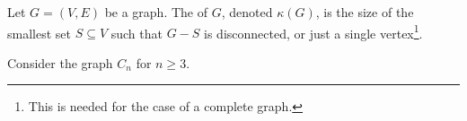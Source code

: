 \documentclass[a4paper]{scrartcl}
\begin{document}
\begin{definition}[Connectivity]
	Let $G = (V, E)$ be a graph. The  of $G$, denoted $\kappa(G)$, is the size of the smallest set $S \subseteq V$ such that $G - S$ is disconnected, or just a single vertex\footnote{This is needed for the case of a complete graph.}.
\end{definition}
\begin{example}[Connectivity of $C_n$]
	Consider the graph $C_n$ for $n \geq 3$.
	\begin{center}
		


\begin{tikzpicture}[x=0.75pt,y=0.75pt,yscale=-1,xscale=1]


\end{tikzpicture}
\end{center}
\end{example}
\end{document}
